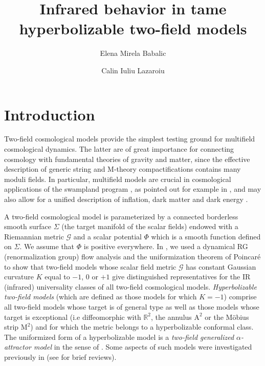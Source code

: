 \documentclass[a4paper,11pt]{article}
\title{Infrared behavior in tame hyperbolizable two-field models}
\author*{Elena Mirela Babalic}
\author{Calin Iuliu Lazaroiu}
\affiliation{Horia Hulubei National Institute of Physics and Nuclear Engineering, Department of Physics,\\
  Reactorului 30, Bucharest-Magurele, 077125, Romania}
\theoremstyle{plain}
\theoremstyle{definition}
\theoremstyle{remark}
\def\R{\mathbb{R}}
\def\cG{\mathcal{G}}
\def\rA{\mathrm{A}}
\def\rM{\mathrm{M}}
\begin{document}
\maketitle




\section{Introduction}

Two-field cosmological models provide the simplest testing ground for
multifield cosmological dynamics. The latter are of great importance for
connecting cosmology with fundamental theories of gravity and matter,
since the effective description of generic string and M-theory
compactifications contains many moduli fields. In particular,
multifield models are crucial in cosmological applications of the
swampland program \cite{V, OV, BCV, BCMV}, as pointed out for example
in \cite{AP, OOSV,GK}, and may also allow for a unified description of
inflation, dark matter and dark energy \cite{AL}.

A two-field cosmological model is parameterized by a connected
borderless smooth surface $\Sigma$ (the target manifold of the scalar
fields) endowed with a Riemannian metric $\cG$ and a scalar potential
$\Phi$ which is a smooth function defined on $\Sigma$. We assume that
$\Phi$ is positive everywhere. In \cite{ren}, we used a dynamical RG 
(renormalization group) flow analysis and the uniformization theorem of Poincar\'e to show
that two-field models whose scalar field metric $\cG$ has constant
Gaussian curvature $K$ equal to $-1$, $0$ or $+1$ give distinguished
representatives for the IR (infrared) universality classes of all two-field
cosmological models. {\em Hyperbolizable two-field models} (which are
defined as those models for which $K=-1$) comprise all two-field
models whose target is of general type as well as those models whose
target is exceptional (i.e diffeomorphic with $\R^2$, the annulus
$\rA^2$ or the M\"obius strip $\rM^2$) and for which the metric belongs
to a hyperbolizable conformal class. The uniformized form of a
hyperbolizable model is a {\em two-field generalized
  $\alpha$-attractor model} in the sense of \cite{genalpha}. Some
aspects of such models were investigated previously in
\cite{elem,modular, Noether1, Noether2, Hesse, Lilia1,Lilia2} (see
\cite{unif,Nis,Tim19, LiliaRev} for brief reviews).
\end{document}
